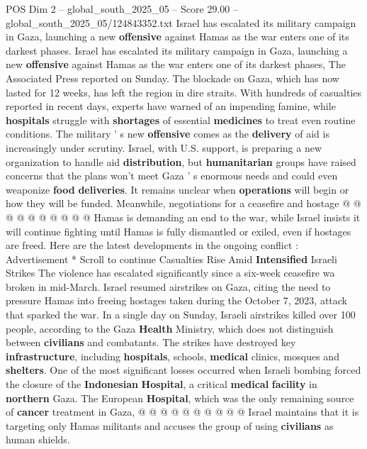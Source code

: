 \begin{textsample}{POS Dim 2 – global\_south\_2025\_05 – Score 29.00 – global\_south\_2025\_05/124843352.txt}  \label{ex:f2_pos_043}
Israel has escalated its military campaign in Gaza, launching a new \textbf{offensive} against Hamas as the war enters one of its darkest phases.
Israel has escalated its military campaign in Gaza, launching a new \textbf{offensive} against Hamas as the war enters one of its darkest phases, The Associated Press reported on Sunday.
The blockade on Gaza, which has now lasted for 12 weeks, has left the region in dire straits.
With hundreds of casualties reported in recent days, experts have warned of an impending famine, while \textbf{hospitals} struggle with \textbf{shortages} of essential \textbf{medicines} to treat even routine conditions.
The military ' s new \textbf{offensive} comes as the \textbf{delivery} of aid is increasingly under scrutiny.
Israel, with U.S. support, is preparing a new organization to handle aid \textbf{distribution}, but \textbf{humanitarian} groups have raised concerns that the plans won't meet Gaza ' s enormous needs and could even weaponize \textbf{food} \textbf{deliveries}.
It remains unclear when \textbf{operations} will begin or how they will be funded.
Meanwhile, negotiations for a ceasefire and hostage @ @ @ @ @ @ @ @ @ @ Hamas is demanding an end to the war, while Israel insists it will continue fighting until Hamas is fully dismantled or exiled, even if hostages are freed.
Here are the latest developments in the ongoing conflict : Advertisement * Scroll to continue Casualties Rise Amid \textbf{Intensified} Israeli Strikes The violence has escalated significantly since a six-week ceasefire wa broken in mid-March.
Israel resumed airstrikes on Gaza, citing the need to pressure Hamas into freeing hostages taken during the October 7, 2023, attack that sparked the war.
In a single day on Sunday, Israeli airstrikes killed over 100 people, according to the Gaza \textbf{Health} Ministry, which does not distinguish between \textbf{civilians} and combatants.
The strikes have destroyed key \textbf{infrastructure}, including \textbf{hospitals}, schools, \textbf{medical} clinics, mosques and \textbf{shelters}.
One of the most significant losses occurred when Israeli bombing forced the closure of the \textbf{Indonesian} \textbf{Hospital}, a critical \textbf{medical} \textbf{facility} in \textbf{northern} Gaza.
The European \textbf{Hospital}, which was the only remaining source of \textbf{cancer} treatment in Gaza, @ @ @ @ @ @ @ @ @ @ Israel maintains that it is targeting only Hamas militants and accuses the group of using \textbf{civilians} as human shields.

\end{textsample}
